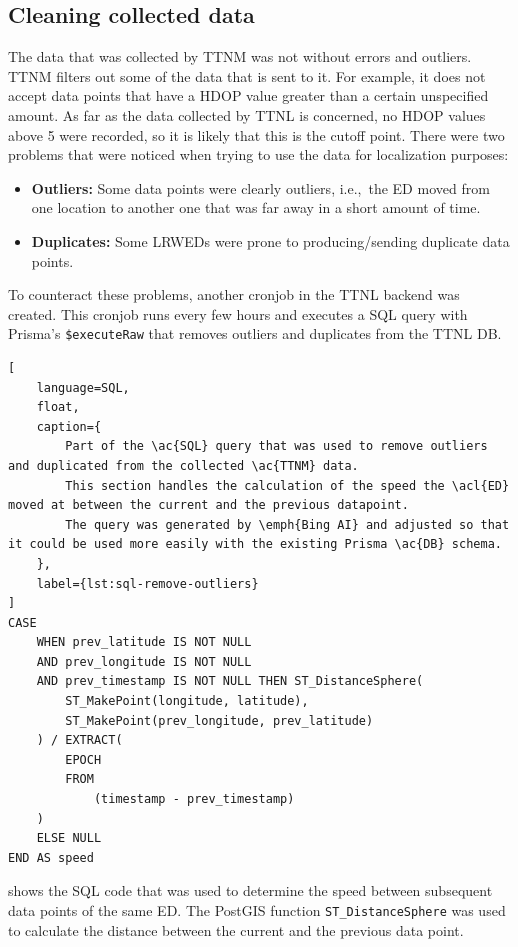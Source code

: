 \subsection{Cleaning collected data}\label{subsec:cleaning-collected-data}

The data that was collected by \ac{TTNM} was not without errors and outliers.
\ac{TTNM} filters out some of the data that is sent to it.
For example, it does not accept data points that have a \ac{HDOP} value greater than a certain unspecified amount.
As far as the data collected by \ac{TTNL} is concerned, no \ac{HDOP} values above 5 were recorded, so it is likely that this is the cutoff point.
There were two problems that were noticed when trying to use the data for localization purposes:

\begin{itemize}
    \item \textbf{Outliers:} Some data points were clearly outliers, i.e.,\ the \acl{ED} moved from one location to another one that was far away in a short amount of time.
    \item \textbf{Duplicates:} Some \aclp{LRWED} were prone to producing/sending duplicate data points.
\end{itemize}

To counteract these problems, another cronjob in the \ac{TTNL} backend was created.
This cronjob runs every few hours and executes a \ac{SQL} query with Prisma's \lstinline|$executeRaw| that removes outliers and duplicates from the \ac{TTNL} \ac{DB}.

\begin{lstlisting}[
    language=SQL,
    float,
    caption={
        Part of the \ac{SQL} query that was used to remove outliers and duplicated from the collected \ac{TTNM} data.
        This section handles the calculation of the speed the \acl{ED} moved at between the current and the previous datapoint.
        The query was generated by \emph{Bing AI} and adjusted so that it could be used more easily with the existing Prisma \ac{DB} schema.
    },
    label={lst:sql-remove-outliers}
]
CASE
    WHEN prev_latitude IS NOT NULL
    AND prev_longitude IS NOT NULL
    AND prev_timestamp IS NOT NULL THEN ST_DistanceSphere(
        ST_MakePoint(longitude, latitude),
        ST_MakePoint(prev_longitude, prev_latitude)
    ) / EXTRACT(
        EPOCH
        FROM
            (timestamp - prev_timestamp)
    )
    ELSE NULL
END AS speed
\end{lstlisting}

 shows the \ac{SQL} code that was used to determine the speed between subsequent data points of the same \acl{ED}.
The PostGIS function \lstinline|ST_DistanceSphere| was used to calculate the distance between the current and the previous data point.

